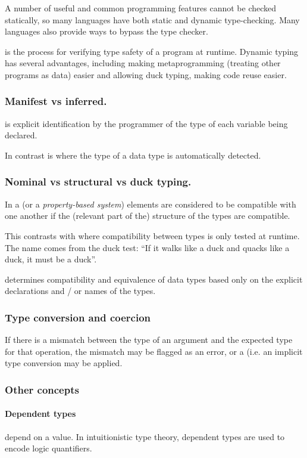 A number of useful and common programming features cannot be checked statically, so many languages have both static and dynamic type-checking. Many languages also provide ways to bypass the type checker.

 is the process for verifying type safety of a program at runtime. Dynamic typing has several advantages, including making metaprogramming (treating other programs as data) easier and allowing duck typing, making code reuse easier.
\subsubsection{Manifest vs inferred.}
 is explicit identification by the programmer of the type of each variable being declared.

In contrast  is where the type of a data type is automatically detected. 
\subsubsection{Nominal vs structural vs duck typing.}
In a  (or a \textit{property-based system}) elements are considered to be compatible with one another if the (relevant part of the) structure of the types are compatible. 

This contrasts with  where compatibility between types is only tested at runtime. The name comes from the duck test: ``If it walks like a duck and quacks like a duck, it must be a duck''.

 determines compatibility and equivalence of data types based only on the explicit declarations and / or names of the types.

\subsubsection{Type conversion and coercion}
If there is a mismatch between the type of an argument and the expected type for that operation, the mismatch may be flagged as an error, or a  (i.e. an implicit type conversion may be applied.

\subsubsection{Other concepts}
\paragraph{Dependent types} depend on a value. In intuitionistic type theory, dependent types are used to encode logic quantifiers.
